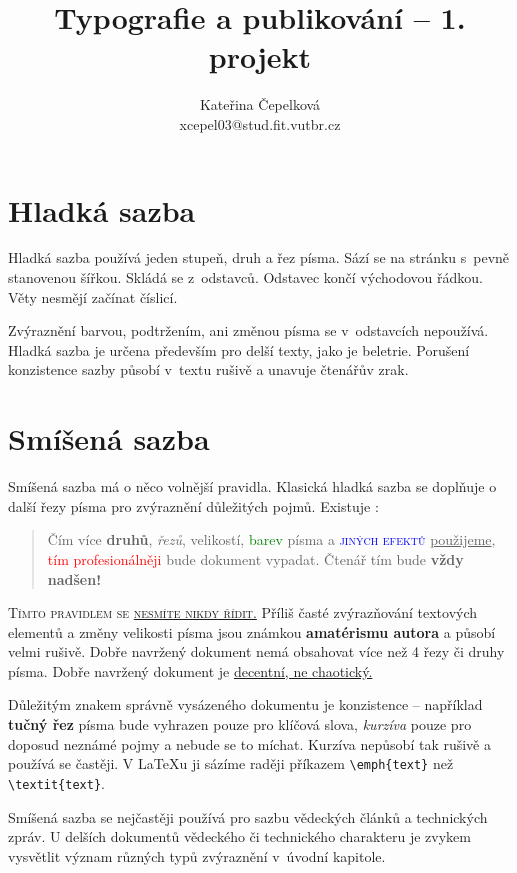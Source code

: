 \documentclass[10pt,a4paper, twocolumn]{article}
\title{ Typografie a publikování -- 1. projekt}
\author{Kateřina Čepelková \\
        xcepel03@stud.fit.vutbr.cz}
\date{}
\begin{document}
 

\maketitle

\section{Hladká sazba}\label{sec:Hladká sazba}
Hladká sazba používá jeden stupeň, druh a řez písma.
Sází se na stránku s~pevně stanovenou šířkou.
Skládá se z~odstavců. Odstavec končí východovou řádkou.
Věty nesmějí začínat číslicí.

Zvýraznění barvou, podtržením, ani změnou písma se v~odstavcích nepoužívá.
Hladká sazba je určena především pro delší texty, jako je beletrie.
Porušení konzistence sazby působí v~textu rušivě a unavuje čtenářův zrak.

\section{Smíšená sazba}\label{sec:Smíšená sazba}
Smíšená sazba má o něco volnější pravidla.
Klasická hladká sazba se doplňuje o další řezy písma pro zvýraznění důležitých pojmů.
Existuje :

\begin{quotation}
Čím více \textbf{druhů}, \emph{řezů}, {\tiny velikostí}, \textcolor{green}{barev}
písma a \textcolor{blue}{\textsc{jiných efektů}} \underline{použijeme},  \textcolor{red}{tím profesionálněji} bude {\selectfont dokument} vypadat.
Čtenář tím bude {\Huge \textbf{vždy nadšen!}}
\end{quotation}

\textsc{Tímto pravidlem se \underline{nesmíte nikdy řídit.}}
Příliš časté zvýrazňování textových elementů a změny {\tiny velikosti} písma jsou známkou \textbf{amatérismu autora} a působí {\selectfont velmi rušivě}.
Dobře navržený dokument nemá obsahovat více než 4 řezy či druhy písma.
Dobře navržený dokument je \underline{decentní, ne chaotický.}

Důležitým znakem správně vysázeného dokumentu je konzistence -- například \textbf{tučný řez} písma bude vyhrazen pouze pro klíčová slova, \emph{kurzíva} pouze pro doposud neznámé pojmy a nebude se to míchat.
Kurzíva nepůsobí tak rušivě a používá se častěji.
V \LaTeX u ji sázíme raději příkazem \verb|\emph{text}| než \verb|\textit{text}|.

Smíšená sazba se nejčastěji používá pro sazbu vědeckých článků a technických zpráv.
U delších dokumentů vědeckého či technického charakteru je zvykem vysvětlit význam různých typů zvýraznění v~úvodní kapitole.
\end{document}
